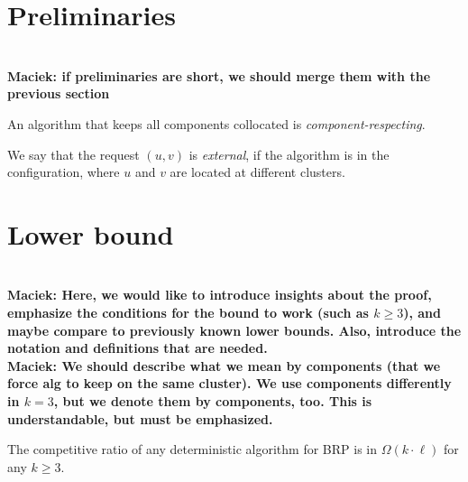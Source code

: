\documentclass[manuscript,screen=true]{acmart}
\newcommand{\OBRP}{BRP}
\newcommand\maciek[1]{\color{brown}\textbf{\\ Maciek: #1}\color{black}}
\begin{document}
\section{Preliminaries}

\maciek{if preliminaries are short, we should merge them with the previous section}

An algorithm that  keeps all components collocated is \emph{component-respecting}.

We say that the request $(u,v)$ is \emph{external}, if the algorithm is in the configuration, where $u$ and $v$ are located at different clusters.


\section{Lower bound} %
\label{sec:lowerbound}


\maciek{Here, we would like to introduce insights about the proof, emphasize the conditions for the bound to work (such as $k\geq 3$), and maybe compare to previously known lower bounds. Also, introduce the notation and definitions that are needed.}
\maciek{We should describe what we mean by  components (that we force alg to keep on the same cluster). We use components differently in $k=3$, but we denote them by components, too. This is understandable, but must be emphasized.}

\begin{theorem}
	The competitive ratio of any deterministic algorithm for \OBRP{} is in $\Omega(k\cdot \ell)$ for any $k\geq 3$.
\end{theorem}
\end{document}
